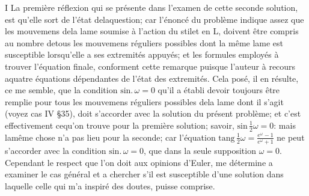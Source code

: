 \documentclass[11pt,a4paper]{article}
\begin{document}


I La première réflexion qui se présente dans l'examen de cette seconde solution, est
qu'elle sort de l'état delaquestion; car l'énoncé du problème indique assez que les
mouvemens dela lame soumise à l'action du stilet en L, doivent être compris au
nombre detous les mouvemens réguliers possibles dont la même lame est susceptible
lorsqu'elle a ses extremités appuyés; et les formules employés à trouver l'équation
finale, conforment cette remarque puisque l'auteur à recours aquatre équations
dépendantes de l'état des extremités. Cela posé, il en résulte, ce me semble,
que la condition $\text{sin.}\,\omega = 0$ qu'il a établi devoir toujours être remplie pour tous les
mouvemens réguliers possibles dela lame dont il s'agit (voyez cas IV §35), doit
s'accorder avec la solution du présent problème; et c'est effectivement cequ'on
trouve pour la première solution; savoir, $\text{sin}\,\frac{1}{2}\omega = 0$: mais lamême chose
n'a pas lieu pour la seconde; car l'équation $\text{tang}\,\frac{1}{2}\omega = \frac{e^{\omega}-1}{e^{\omega}+1}$ ne peut
s'accorder avec la condition $\text{sin.}\,\omega = 0$, que dans la seule supposition $\omega = 0$.
Cependant le respect que l'on doit aux opinions d'Euler, me détermine a
examiner le cas général et a chercher s'il est susceptible d'une solution
dans laquelle celle qui m'a inspiré des doutes, puisse  comprise.
\end{document}
